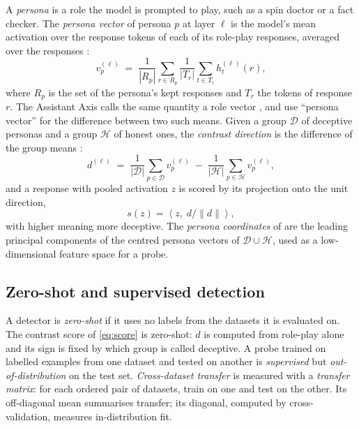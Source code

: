 A \emph{persona} is a role the model is prompted to play, such as a spin doctor or a fact checker.
The \emph{persona vector} of persona $p$ at layer $\ell$ is the model's mean activation over the
response tokens of each of its role-play responses, averaged over the responses
\cite{mahadik2026persona}:
\begin{equation}
  v^{(\ell)}_p \;=\; \frac{1}{|R_p|} \sum_{r \in R_p} \frac{1}{|T_r|} \sum_{t \in T_r} h^{(\ell)}_t(r),
  \label{eq:persona}
\end{equation}
where $R_p$ is the set of the persona's kept responses and $T_r$ the tokens of response $r$. The
Assistant Axis calls the same quantity a role vector \cite{lu2026assistant}, and
\textcite{chen2025persona} use ``persona vector'' for the difference between two such means. Given a
group $\mathcal{D}$ of deceptive personas and a group $\mathcal{H}$ of honest ones, the \emph{contrast direction} is the
difference of the group means \cite{mahadik2026persona}:
\begin{equation}
  d^{(\ell)} \;=\; \frac{1}{|\mathcal{D}|}\sum_{p\in \mathcal{D}} v^{(\ell)}_p \;-\; \frac{1}{|\mathcal{H}|}\sum_{p\in \mathcal{H}} v^{(\ell)}_p ,
  \label{eq:contrast}
\end{equation}
and a response with pooled activation $z$ is scored by its projection onto the unit direction,
\begin{equation}
  s(z) = \left\langle z, \; d / \lVert d \rVert \right\rangle ,
  \label{eq:score}
\end{equation}
with higher meaning more deceptive. The \emph{persona coordinates} of \textcite{mahadik2026persona}
are the leading principal components of the centred persona vectors of $\mathcal{D} \cup \mathcal{H}$, used as a
low-dimensional feature space for a probe.

\subsection{Zero-shot and supervised detection}

A detector is \emph{zero-shot} if it uses no labels from the datasets it is evaluated on. The
contrast score of \cref{eq:score} is zero-shot: $d$ is computed from role-play alone and its sign is
fixed by which group is called deceptive. A probe trained on labelled examples from one dataset and
tested on another is \emph{supervised} but \emph{out-of-distribution} on the test set.
\emph{Cross-dataset transfer} is measured with a \emph{transfer matrix}: for each ordered pair of
datasets, train on one and test on the other. Its off-diagonal mean summarises transfer; its
diagonal, computed by cross-validation, measures in-distribution fit.


